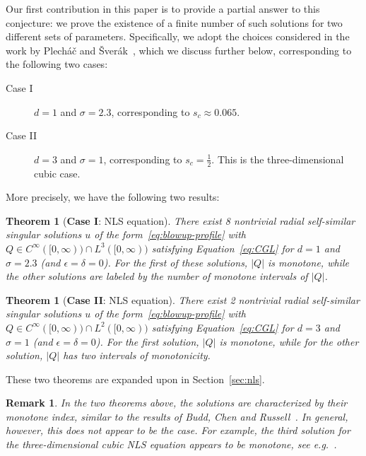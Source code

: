 \documentclass[11pt]{article}
\newtheorem{remark}[definition]{Remark}
\newtheorem{theorem}[definition]{Theorem}
\begin{document}
Our first contribution in this paper is to provide a partial answer to
this conjecture: we prove the existence of a finite number of such
solutions for two different sets of parameters. Specifically, we adopt
the choices considered in the work by Plecháč and
Šverák~\cite{Plech2001}, which we discuss further below, corresponding
to the following two cases:
\begin{description}
\item[Case I] \(d = 1\) and \(\sigma = 2.3\), corresponding to
  \(s_{c} \approx 0.065\).
\item[Case II] \(d = 3\) and \(\sigma = 1\), corresponding to
  \(s_{c} = \frac{1}{2}\). This is the three-dimensional cubic case.
\end{description}
More precisely, we have the following two results:

\begin{theorem}[\textbf{Case I}: NLS equation]\label{thm:NLS-intro}
  There exist 8 nontrivial radial self-similar singular solutions
  \(u\) of the form~\eqref{eq:blowup-profile} with
  \(Q \in C^{\infty}([0, \infty)) \cap L^3([0, \infty))\)
  satisfying Equation~\eqref{eq:CGL} for \(d = 1\) and
  \(\sigma = 2.3\) (and \(\epsilon = \delta = 0\)). For the first of these
  solutions, \(|Q|\) is monotone, while the other solutions are
  labeled by the number of monotone intervals of \(|Q|\).
  \end{theorem}

\begin{theorem}[\textbf{Case II}: NLS equation]
  There exist 2 nontrivial radial self-similar singular solutions
  \(u\) of the form~\eqref{eq:blowup-profile} with
  \(Q \in C^{\infty}([0, \infty)) \cap L^2([0, \infty))\)
  satisfying Equation~\eqref{eq:CGL} for \(d = 3\) and
  \(\sigma = 1\) (and \(\epsilon = \delta = 0\)). For the first solution,
  \(|Q|\) is monotone, while for the other solution, \(|Q|\) has two
  intervals of monotonicity.
\end{theorem}

These two theorems are expanded upon in Section~\ref{sec:nls}.

\begin{remark}
  In the two theorems above, the solutions are characterized by their
  monotone index, similar to the results of Budd, Chen and
  Russell~\cite{Budd99}. In general, however, this does not appear to
  be the case. For example, the third solution for the
  three-dimensional cubic NLS equation appears to be monotone, see
  e.g.~\cite[Figure 3.9]{Plech2001}.
\end{remark}
\end{document}
